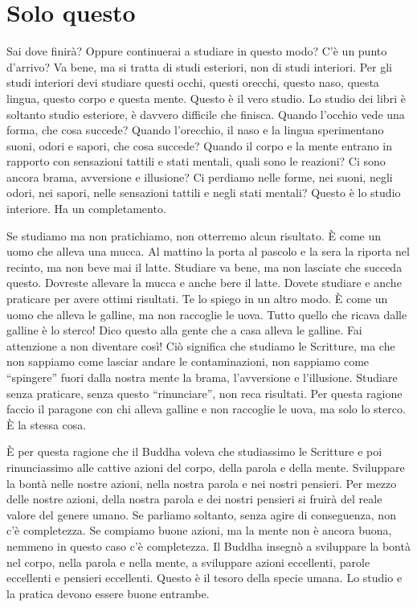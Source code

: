 \chapter{Solo questo}

Sai dove finirà? Oppure continuerai a studiare in questo modo? C'è un
punto d'arrivo? Va bene, ma si tratta di studi esteriori, non di studi
interiori. Per gli studi interiori devi studiare questi occhi, questi
orecchi, questo naso, questa lingua, questo corpo e questa mente. Questo
è il vero studio. Lo studio dei libri è soltanto studio esteriore, è
davvero difficile che finisca. Quando l'occhio vede una forma, che cosa
succede? Quando l'orecchio, il naso e la lingua sperimentano suoni,
odori e sapori, che cosa succede? Quando il corpo e la mente entrano in
rapporto con sensazioni tattili e stati mentali, quali sono le reazioni?
Ci sono ancora brama, avversione e illusione? Ci perdiamo nelle forme,
nei suoni, negli odori, nei sapori, nelle sensazioni tattili e negli
stati mentali? Questo è lo studio interiore. Ha un completamento.

Se studiamo ma non pratichiamo, non otterremo alcun risultato. È come un
uomo che alleva una mucca. Al mattino la porta al pascolo e la sera la
riporta nel recinto, ma non beve mai il latte. Studiare va bene, ma non
lasciate che succeda questo. Dovreste allevare la mucca e anche bere il
latte. Dovete studiare e anche praticare per avere ottimi risultati. Te
lo spiego in un altro modo. È come un uomo che alleva le galline, ma non
raccoglie le uova. Tutto quello che ricava dalle galline è lo sterco!
Dico questo alla gente che a casa alleva le galline. Fai attenzione a
non diventare così! Ciò significa che studiamo le Scritture, ma che non
sappiamo come lasciar andare le contaminazioni, non sappiamo come
``spingere'' fuori dalla nostra mente la brama, l'avversione e
l'illusione. Studiare senza praticare, senza questo ``rinunciare'', non
reca risultati. Per questa ragione faccio il paragone con chi alleva
galline e non raccoglie le uova, ma solo lo sterco. È la stessa cosa.

È per questa ragione che il Buddha voleva che studiassimo le Scritture e
poi rinunciassimo alle cattive azioni del corpo, della parola e della
mente. Sviluppare la bontà nelle nostre azioni, nella nostra parola e
nei nostri pensieri. Per mezzo delle nostre azioni, della nostra parola
e dei nostri pensieri si fruirà del reale valore del genere umano. Se
parliamo soltanto, senza agire di conseguenza, non c'è completezza. Se
compiamo buone azioni, ma la mente non è ancora buona, nemmeno in questo
caso c'è completezza. Il Buddha insegnò a sviluppare la bontà nel corpo,
nella parola e nella mente, a sviluppare azioni eccellenti, parole
eccellenti e pensieri eccellenti. Questo è il tesoro della specie umana.
Lo studio e la pratica devono essere buone entrambe.

